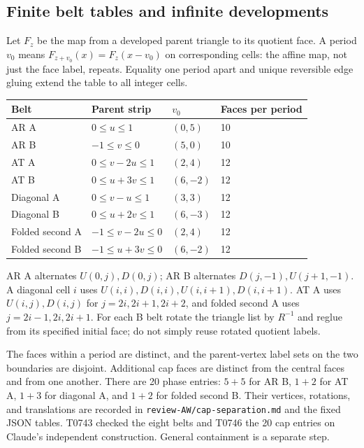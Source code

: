 \documentclass[11pt]{amsart}
\newcommand{\record}[1]{\nolinkurl{#1}}
\begin{document}
\subsection{Finite belt tables and infinite developments}
Let $F_z$ be the map from a developed parent triangle to its quotient
face. A period $v_0$ means $F_{z+v_0}(x)=F_z(x-v_0)$ on corresponding
cells: the affine map, not just the face label, repeats. Equality one
period apart and unique reversible edge gluing extend the table to all
integer cells.
\begin{center}\small
\begin{tabular}{llll}\toprule
Belt & Parent strip & $v_0$ & Faces per period\\\midrule
AR A & $0\le u\le1$ & $(0,5)$ &10\\
AR B & $-1\le v\le0$ & $(5,0)$ &10\\
AT A & $0\le v-2u\le1$ & $(2,4)$ &12\\
AT B & $0\le u+3v\le1$ & $(6,-2)$ &12\\
Diagonal A & $0\le v-u\le1$ & $(3,3)$ &12\\
Diagonal B & $0\le u+2v\le1$ & $(6,-3)$ &12\\
Folded second A & $-1\le v-2u\le0$ & $(2,4)$ &12\\
Folded second B & $-1\le u+3v\le0$ & $(6,-2)$ &12\\\bottomrule
\end{tabular}\end{center}
AR A alternates $U(0,j),D(0,j)$; AR B alternates
$D(j,-1),U(j+1,-1)$. A diagonal cell $i$ uses
$U(i,i),D(i,i),U(i,i+1),D(i,i+1)$. AT A uses $U(i,j),D(i,j)$ for
$j=2i,2i+1,2i+2$, and folded second A uses $j=2i-1,2i,2i+1$.
For each B belt rotate the triangle list by $R^{-1}$ and reglue from
its specified initial face; do not simply reuse rotated quotient labels.

The faces within a period are distinct, and the parent-vertex label
sets on the two boundaries are disjoint. Additional cap faces are
distinct from the central faces and from one another. There are 20
phase entries: $5+5$ for AR B, $1+2$ for AT A, $1+3$ for diagonal A,
and $1+2$ for folded second B. Their vertices, rotations, and translations
are recorded in \record{review-AW/cap-separation.md} and the fixed JSON
tables. T0743 checked the eight belts and T0746 the 20 cap entries on
Claude's independent construction. General containment is a separate step.
\end{document}
